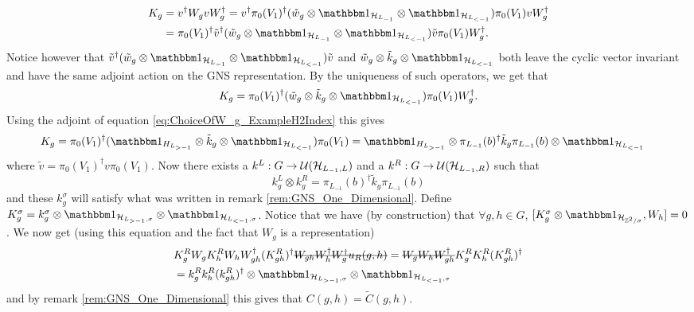 \documentclass[11pt,a4paper,twoside]{article}
\numberwithin{equation}{section}
\begin{document}
	\begin{align}
		K_g&=v^\dagger W_g v W_g^\dagger=v^\dagger \pi_{0}(V_1)^{\dagger}(\tilde{w}_g\otimes\id_{\HH_{L_{-1}}}\otimes\id_{\HH_{L_{<-1}}}) \pi_{0}(V_1) v W_g^\dagger\\
		&=\pi_{0}(V_1)^{\dagger}\tilde v^\dagger(\tilde{w}_g\otimes\id_{\HH_{L_{-1}}}\otimes\id_{\HH_{L_{<-1}}}) \tilde v \pi_{0}(V_1) W_g^\dagger.
	\end{align}
	Notice however that $\tilde v^\dagger(\tilde{w}_g\otimes\id_{\HH_{L_{-1}}}\otimes\id_{\HH_{L_{<-1}}}) \tilde v$ and $\tilde{w}_g\otimes\tilde{k}_g\otimes\id_{\HH_{L_{<-1}}}$ both leave the cyclic vector invariant and have the same adjoint action on the GNS representation. By the uniqueness of such operators, we get that
	\begin{equation}
		K_g=\pi_{0}(V_1)^{\dagger}(\tilde{w}_g\otimes\tilde{k}_g\otimes\id_{\HH_{L_{<-1}}}) \pi_{0}(V_1) W_g^\dagger.
	\end{equation}
	Using the adjoint of equation \eqref{eq:ChoiceOfW_g_ExampleH2Index} this gives
	\begin{align}
		K_g&=\pi_{0}(V_1)^{\dagger}(\id_{H_{L_{>-1}}}\otimes \tilde k_g \otimes\id_{\HH_{L_{<-1}}}) \pi_{0}(V_1)=\id_{H_{L_{>-1}}}\otimes \pi_{L_{-1}}(b)^\dagger \tilde k_g \pi_{L_{-1}}(b) \otimes\id_{\HH_{L_{<-1}}}
	\end{align}
	where $\tilde{v}=\pi_0(V_1)^\dagger v\pi_0(V_1)$. Now there exists a $k^L:G\rightarrow \mathcal U(\mathcal H_{L_{-1},L})$ and a $k^R:G\rightarrow \mathcal U(\mathcal H_{L_{-1},R})$ such that
	\begin{equation}
		k^L_g\otimes k^R_g=\pi_{L_{-1}}(b)^\dagger \tilde k_g \pi_{L_{-1}}(b)
	\end{equation}
	and these $k^\sigma_g$ will satisfy what was written in remark \ref{rem:GNS_One_Dimensional}. Define $K^\sigma_g=k^\sigma_g\otimes\id_{\HH_{L_{>-1},\sigma}}\otimes\id_{\HH_{L_{<-1},\sigma}}$. Notice that we have (by construction) that $\forall g,h\in G$, $[K^\sigma_g\otimes\id_{\HH_{\ZZ^2/\sigma}},W_h]=0$. We now get (using this equation and the fact that $W_g$ is a representation)
	\begin{align}
		&K_g^R W_g K_h^R W_h W_{gh}^\dagger (K_{gh}^R)^\dagger \stkout{W_{gh}W_h^\dagger W_g^\dagger u_R(g,h)}=\stkout{W_g W_h W_{gh}^\dagger} K_g^R K_h^R (K_{gh}^R)^\dagger\\
		&=k_g^R k_h^R (k_{gh}^R)^\dagger\otimes \id_{\HH_{L_{>-1},\sigma}}\otimes\id_{\HH_{L_{<-1},\sigma}}
	\end{align}
	and by remark \ref{rem:GNS_One_Dimensional} this gives that $C(g,h)=\tilde{C}(g,h)$.
\end{document}
